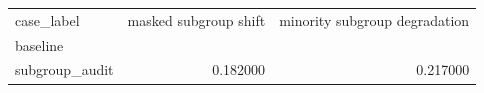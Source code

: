 \begin{tabular}{lrr}
\toprule
case_label & masked subgroup shift & minority subgroup degradation \\
baseline &  &  \\
\midrule
subgroup_audit & 0.182000 & 0.217000 \\
\bottomrule
\end{tabular}
